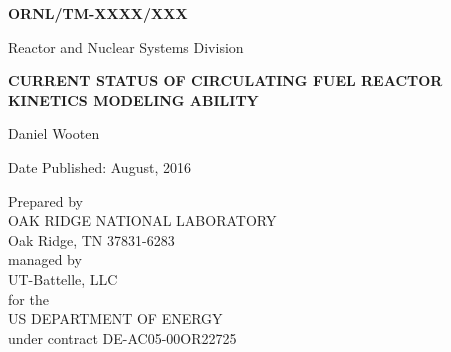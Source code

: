 \documentclass[11pt,letterpaper,twoside,english,final]{article}
\begin{document}
\newpage

\begin{titlepage}


\begin{flushright}{\textsf{\bfseries{\large{ORNL/TM-XXXX/XXX}}}}\\ 
\end{flushright}

\vspace{0.5in}

\begin{center}
Reactor and Nuclear Systems Division
\end{center}

\vspace{1.25in}

\begin{center}
{\bf{\large{CURRENT STATUS OF CIRCULATING FUEL REACTOR KINETICS MODELING
    ABILITY}}}\\
\vspace{0.5in}

Daniel Wooten

\vspace{1.35in}

Date Published: August, 2016 

\vspace{1.35in}

Prepared by \\
OAK RIDGE NATIONAL LABORATORY \\
Oak Ridge, TN 37831-6283 \\
managed by \\
UT-Battelle, LLC \\
for the \\
US DEPARTMENT OF ENERGY \\
under contract DE-AC05-00OR22725

\end{center}

\end{titlepage}


\clearemptydoublepage 
\begin{centering}
\tableofcontents 
\end{centering}



\setcounter{page}{3}
\end{document}
